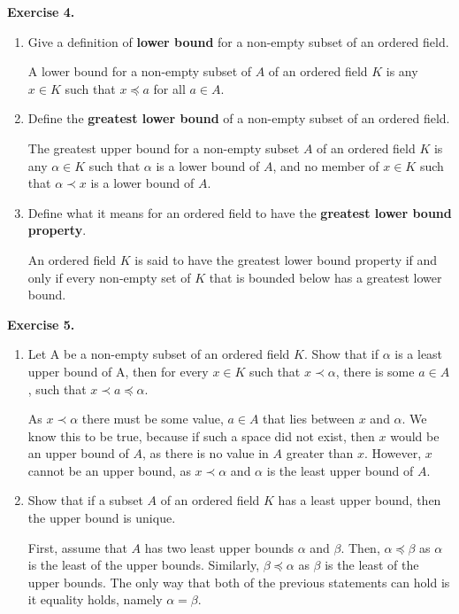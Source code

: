\documentclass[11pt, leqno]{article}
\begin{document}
\vspace{1pc}
	
\textbf{Exercise 4.}

\begin{enumerate}[label=(\alph*)]

	\item
	Give a definition of \textbf{lower bound} for a non-empty subset of an ordered field.
	
	A lower bound for a non-empty subset of $A$ of an ordered field $K$ is any $x \in K$ such that $x \preceq a$ for all $a \in A$.
	
	\item
	Define the \textbf{greatest lower bound} of a non-empty subset of an ordered field.
	
	The greatest upper bound for a non-empty subset $A$ of an ordered field $K$ is any $\alpha \in K$ such that $\alpha$ is a lower bound of $A$, and no member of $x \in K$ such that $\alpha \prec x$ is a lower bound of $A$.
	
	\item
	Define what it means for an ordered field to have the \textbf{greatest lower bound property}.
	
	An ordered field $K$ is said to have the greatest lower bound property if and only if every non-empty set of $K$ that is bounded below has a greatest lower bound.

\end{enumerate}

\vspace{1pc}

\textbf{Exercise 5.}

\begin{enumerate}[label=(\alph*)]

	\item
	Let A be a non-empty subset of an ordered field $K$. Show that if $\alpha$ is a least upper bound of A, then for every $x \in K$ such that $x \prec \alpha$, there is some $a \in A$, such that $x \prec a \preceq \alpha$.
	
	As $x \prec \alpha$ there must be some value, $a \in A$ that lies between $x$ and $\alpha$. We know this to be true, because if such a space did not exist, then $x$ would be an upper bound of $A$, as there is no value in $A$ greater than $x$. However, $x$ cannot be an upper bound, as $x \prec \alpha$ and $\alpha$ is the least upper bound of $A$.
	
	\item
	Show that if a subset $A$ of an ordered field $K$ has a least upper bound, then the upper bound is unique.
	
	First, assume that $A$ has two least upper bounds $\alpha$ and $\beta$. Then, $\alpha \preceq \beta$ as $\alpha$ is the least of the upper bounds. Similarly, $\beta \preceq \alpha$ as $\beta$ is the least of the upper bounds. The only way that both of the previous statements can hold is it equality holds, namely $\alpha = \beta$.

\end{enumerate}
\end{document}
